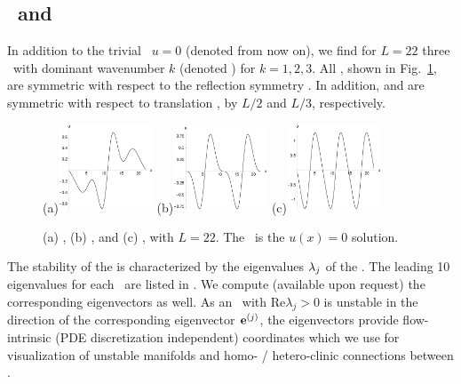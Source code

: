 \subsection{\Eqva\ and \reqva}

In addition to the trivial \eqv\ $u=0$ (denoted  from now
on), we find for $L = 22$ three \eqva\ with dominant wavenumber $k$
(denoted ) for $k = 1, 2, 3$.  All {\eqva}, shown in
Fig.~\ref{f:KS22Equil}, are symmetric with respect to the reflection
symmetry . 
In addition,  and  are symmetric with respect
to translation , 
by $L/2$ and $L/3$, respectively.

\begin{figure}[t]
\begin{center}
(a)\includegraphics[width=0.25\textwidth]{figs/1wKS22equil.eps}
(b)\includegraphics[width=0.25\textwidth]{figs/2wKS22equil.eps}
(c)\includegraphics[width=0.25\textwidth]{figs/3wKS22equil.eps}
\end{center}
\caption{
(a) , (b) , and (c)
 \eqva, with $L=22$. The  \eqv\ is the $u(x)=0$
solution.
}
\label{f:KS22Equil}
\end{figure}

The stability of the {\eqva} is characterized by the eigenvalues
$\eigExp[j]$ of the \stabmat.  The leading 10 eigenvalues for each
\eqv\ are listed in . We compute (available upon request)
the corresponding eigenvectors as well. As an \eqv\ with $\mathrm{Re}
\lambda_j > 0$ is unstable in the direction of the corresponding
eigenvector $\jEigvec{j}$, the eigenvectors provide flow-intrinsic 
(PDE discretization independent) coordinates which we use for visualization
of unstable manifolds and homo- / hetero-clinic connections between
\eqva.

